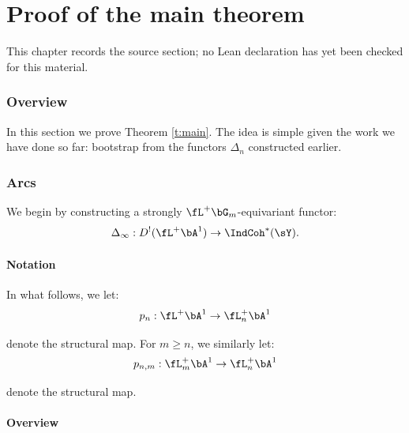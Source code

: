 \chapter{Proof of the main theorem}
\label{tates-thesis-de-rham-setting-chapter-08}

\begin{remark}
\label{tates-thesis-de-rham-setting-chapter-08-source}
This chapter records the source section; no Lean declaration has yet been checked for this material.
\notready
\end{remark}

\label{s:main}

\subsection{Overview}

In this section we prove Theorem \ref{t:main}. The idea is simple given the
work we have done so far: bootstrap from the functors $\Delta_n$ constructed
earlier.


\subsection{Arcs}\label{ss:delta-arcs}

We begin by constructing a strongly $\fL^+\bG_m$-equivariant functor:
%
\[
\Delta_{\infty}:D^!(\fL^+\bA^1) \to \IndCoh^*(\sY).
\]

\subsubsection{Notation}

In what follows, we let:
%
\[
p_n:\fL^+ \bA^1 \to \fL_n^+\bA^1
\]

 denote the structural map.
For $m \geq n$, we similarly let:
%
\[
p_{n,m}:\fL_m^+\bA^1 \to \fL_n^+\bA^1
\]

 denote the structural map.

\subsubsection{Overview}


